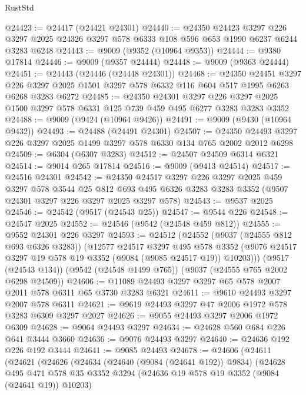 \begin{lexlean}{RustStd}
\begin{coremodule}
@24423 := @24417 (@24421 @24301)
@24440 := @24350
    @24423
    @3297
    @226
    @3297
    @2025
    @24326
    @3297
    @578
    @6333
    @108
    @596
    @653
    @1990
    @6237
    @6244
    @3283
    @6248
@24443 := @9009 (@9352 (@10964 @9353))
@24444 := @9380 @17814
@24446 := @9009 (@9357 @24444)
@24448 := @9009 (@9363 @24444)
@24451 := @24443 (@24446 (@24448 @24301))
@24468 := @24350
    @24451
    @3297
    @226
    @3297
    @2025
    @1501
    @3297
    @578
    @6332
    @116
    @604
    @517
    @1995
    @6263
    @6268
    @3283
    @6272
@24485 := @24350
    @24301
    @3297
    @226
    @3297
    @2025
    @1500
    @3297
    @578
    @6331
    @125
    @739
    @459
    @495
    @6277
    @3283
    @3283
    @3352
@24488 := @9009 (@9424 (@10964 @9426))
@24491 := @9009 (@9430 (@10964 @9432))
@24493 := @24488 (@24491 @24301)
@24507 := @24350 @24493 @3297 @226 @3297 @2025 @1499 @3297 @578 @6330 @134 @765 @2002 @2012 @6298
@24509 := @6304 (@6307 @3283)
@24512 := @24507 @24509 @6314 @6321
@24514 := @9014 @265 @17814
@24516 := @9009 (@9413 @24514)
@24517 := @24516 @24301
@24542 := @24350
    @24517
    @3297
    @226
    @3297
    @2025
    @459
    @3297
    @578
    @3544
    @25
    @812
    @693
    @495
    @6326
    @3283
    @3283
    @3352
    (@9507 @24301 @3297 @226 @3297 @2025 @3297 @578)
@24543 := @9537 @2025
@24546 := @24542 (@9517 (@24543 @25))
@24547 := @9544 @226
@24548 := @24547 @2025
@24552 := @24546 (@9542 (@24548 @459 @812))
@24555 := @9552 @24301 @226 @3297
@24593 := @24512
    (@24552
      (@9037 (@24555 @812 @693 @6326 @3283))
      (@12577
        @24517
        @3297
        @495
        @578
        @3352
        (@9076 @24517 @3297 @19 @578 @19 @3352 (@9084 (@9085 @24517 @19)) @10203)))
    (@9517 (@24543 @134))
    (@9542 (@24548 @1499 @765))
    (@9037 (@24555 @765 @2002 @6298 @24509))
@24606 := @11089 @24493 @3297 @3297 @65 @578 @2007 @2011 @578 @6311 @65 @3730 @3283 @6321
@24611 := @9610 @24493 @3297 @2007 @578 @6311
@24621 := @9619 @24493 @3297 @47 @2006 @1972 @578 @3283 @6309 @3297 @2027
@24626 := @9055 @24493 @3297 @2006 @1972 @6309
@24628 := @9064 @24493 @3297
@24634 := @24628 @560 @684 @226 @641 @3444 @3660
@24636 := @9076 @24493 @3297
@24640 := @24636 @192 @226 @192 @3444
@24641 := @9085 @24493
@24678 := @24606
    (@24611
      (@24621
        (@24626
          (@24634
            (@24640 (@9084 (@24641 @192)) @9834)
            (@24628
              @495
              @471
              @578
              @35
              @3352
              @3294
              (@24636 @19 @578 @19 @3352 (@9084 (@24641 @19)) @10203)

\end{coremodule}
\end{lexlean}
